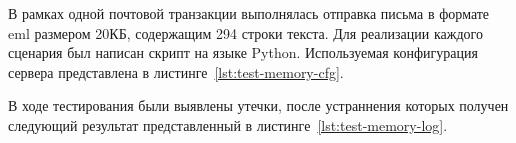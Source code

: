 В рамках одной почтовой транзакции выполнялась отправка письма в формате eml размером 20КБ, содержащим 294 строки текста.
Для реализации каждого сценария был написан скрипт на языке Python.
Используемая конфигурация сервера представлена в листинге~\ref{lst:test-memory-cfg}.



В ходе тестирования были выявлены утечки, после устраннения которых получен следующий результат представленный в листинге~\ref{lst:test-memory-log}.


